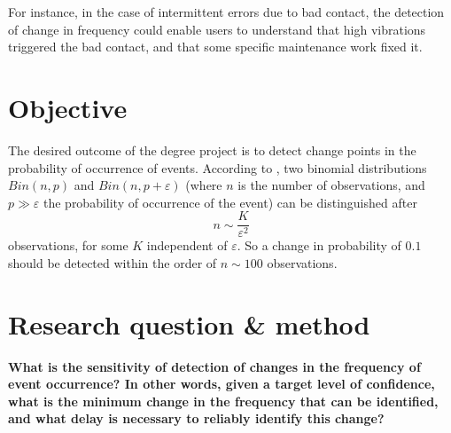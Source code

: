 \documentclass{kththesis}
\begin{document}
For instance, in the case of intermittent errors due to bad contact, the detection of change in frequency could enable users to understand that high vibrations triggered the bad contact, and that some specific maintenance work fixed it.

%

\section{Objective}

The desired outcome of the degree project is to detect change points in the probability of occurrence of events.
According to \parencite{baigneres2004}, two binomial distributions $Bin(n, p)$ and $Bin(n, p+\varepsilon)$ (where $n$ is the number of observations, and $p \gg \varepsilon$ the probability of occurrence of the event) can be distinguished after 
$$n \sim \dfrac{K}{\varepsilon^2}$$
observations, for some $K$ independent of $\varepsilon$.
So a change in probability of $0.1$ should be detected within the order of $n \sim 100$ observations.

\section{Research question \& method}

\textbf{What is the sensitivity of detection of changes in the frequency of event occurrence? In other words, given a target level of confidence, what is the minimum change in the frequency that can be identified, and what delay is necessary to reliably identify this change?}
\end{document}
